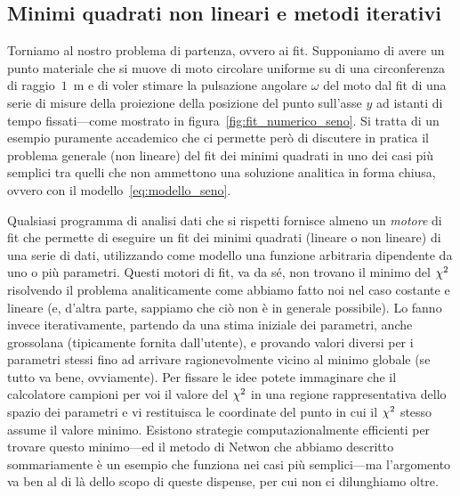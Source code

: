 \subsection{Minimi quadrati non lineari e metodi iterativi}
\label{sec:fit_numerici}

Torniamo al nostro problema di partenza, ovvero ai fit.  Supponiamo di avere un
punto materiale che si muove di moto circolare uniforme su di una circonferenza
di raggio~$1$~m e di voler stimare la pulsazione angolare $\omega$ del moto dal
fit di una serie di misure della proiezione della posizione del punto sull'asse
$y$ ad istanti di tempo fissati---come mostrato in
figura~\ref{fig:fit_numerico_seno}. Si tratta di un esempio puramente accademico
che ci permette però di discutere in pratica il problema generale (non
lineare) del fit dei minimi quadrati in uno dei casi più semplici tra quelli
che non ammettono una soluzione analitica in forma chiusa, ovvero con il
modello~\eqref{eq:modello_seno}.


Qualsiasi programma di analisi dati che si rispetti fornisce almeno un
\emph{motore} di fit che permette di eseguire un fit dei minimi quadrati
(lineare o non lineare) di una serie di dati, utilizzando come modello
una funzione arbitraria dipendente da uno o più parametri. Questi motori
di fit, va da sé, non trovano il minimo del $\chi^2$ risolvendo il
problema analiticamente come abbiamo fatto noi nel caso costante e lineare
(e, d'altra parte, sappiamo che ciò non è in generale possibile).
Lo fanno invece iterativamente, partendo da una stima iniziale dei parametri,
anche grossolana (tipicamente fornita dall'utente), e provando valori diversi
per i parametri stessi fino ad arrivare ragionevolmente vicino al minimo
globale (se tutto va bene, ovviamente). Per fissare le idee potete immaginare
che il calcolatore campioni per voi il valore del $\chi^2$ in una regione
rappresentativa dello spazio dei parametri e vi restituisca le coordinate del
punto in cui il $\chi^2$ stesso assume il valore minimo. Esistono strategie
computazionalmente efficienti per trovare questo minimo---ed il metodo di
Netwon che abbiamo descritto sommariamente è un esempio che funziona nei
casi più semplici---ma l'argomento va ben al di là dello scopo di queste
dispense, per cui non ci dilunghiamo oltre.

